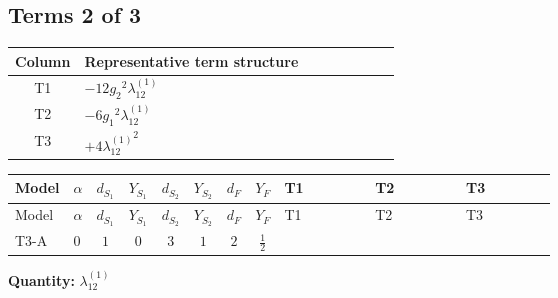 \documentclass[8pt]{article}
\begin{document}
\begin{landscape}
\subsection*{Terms 2 of 3}
\begin{center}
\begin{tabular}{@{}c >{\raggedright\arraybackslash}p{0.82\linewidth}@{}}
\toprule
Column & Representative term structure \\
\midrule
T1 & \(\displaystyle -12 {g_2}^2 {\lambda_{12}^{(1)}}\) \\
\midrule
T2 & \(\displaystyle -6 {g_1}^2 {\lambda_{12}^{(1)}}\) \\
\midrule
T3 & \(\displaystyle +4 {\lambda_{12}^{(1)}}^2\) \\
\midrule
\bottomrule
\end{tabular}
\end{center}
\smallskip
\tiny
\begin{longtable}{@{}llcccccc >{\raggedright\arraybackslash}p{0.21\linewidth} >{\raggedright\arraybackslash}p{0.21\linewidth} >{\raggedright\arraybackslash}p{0.21\linewidth}@{}}
\toprule
Model & $\alpha$ & $d_{S_1}$ & $Y_{S_1}$ & $d_{S_2}$ & $Y_{S_2}$ & $d_F$ & $Y_F$ & T1 & T2 & T3 \\
\midrule
\endfirsthead
\toprule
Model & $\alpha$ & $d_{S_1}$ & $Y_{S_1}$ & $d_{S_2}$ & $Y_{S_2}$ & $d_F$ & $Y_F$ & T1 & T2 & T3 \\
\midrule
\endhead
T3-A & $0$ & $1$ & $0$ & $3$ & $1$ & $2$ & $\frac{1}{2}$ & \scriptsize\adjustbox{max width=\linewidth}{$\begin{gathered} -12 {g_2}^2 {\lambda_{12}^{(1)}}\end{gathered}$} & \scriptsize\adjustbox{max width=\linewidth}{$\begin{gathered} -6 {g_1}^2 {\lambda_{12}^{(1)}}\end{gathered}$} & \scriptsize\adjustbox{max width=\linewidth}{$\begin{gathered} +4 {\lambda_{12}^{(1)}}^2\end{gathered}$} \\
\midrule
\bottomrule
\end{longtable}
\clearpage
\noindent\textbf{Quantity: }$\lambda_{12}^{(1)}$\par\smallskip

\end{landscape}
\end{document}
